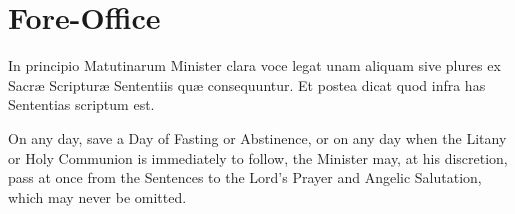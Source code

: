 \section{Fore-Office}
\begin{secrubric}
    In principio Matutinarum Minister clara voce legat unam aliquam sive plures ex Sacræ Scripturæ Sententiis quæ consequuntur. Et postea dicat quod infra has Sententias scriptum est.
\end{secrubric}
\begin{secrubric}
    On any day, save a Day of Fasting or Abstinence, or on any day when the Litany or Holy Communion is immediately to follow, the Minister may, at his discretion, pass at once from the Sentences to the Lord's Prayer and Angelic Salutation, which may never be omitted.
\end{secrubric}

